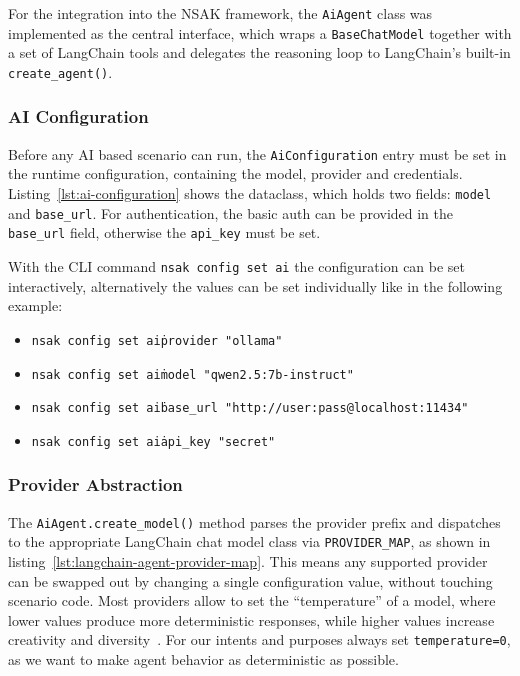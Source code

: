 For the integration into the \gls{NSAK} framework,
the \texttt{AiAgent} class was implemented as the central interface,
which wraps a \texttt{BaseChatModel} together with a set of LangChain tools and delegates the reasoning loop to LangChain's built-in \texttt{create_agent()}.

\subsubsection{AI Configuration}\label{subsubsec:ai-configuration}

Before any \gls{AI} based scenario can run, the \texttt{AiConfiguration} entry must be set in the runtime configuration,
containing the model, provider and credentials.
Listing~\ref{lst:ai-configuration} shows the dataclass, which holds two fields: \texttt{model} and \texttt{base_url}.
For authentication, the basic auth can be provided in the \texttt{base_url} field,
otherwise the \texttt{api_key} must be set.

With the \gls{CLI} command \texttt{nsak config set ai} the configuration can be set interactively,
alternatively the values can be set individually like in the following example:

\begin{itemize}
    \item \texttt{nsak config set ai\.provider "ollama"}
    \item \texttt{nsak config set ai\.model "qwen2.5:7b-instruct"}
    \item \texttt{nsak config set ai\.base\_url "http://user:pass@localhost:11434"}
    \item \texttt{nsak config set ai\.api\_key "secret"}
\end{itemize}

\subsubsection{Provider Abstraction}\label{subsubsec:ai-provider-abstraction}

The \texttt{AiAgent.create_model()} method parses the provider prefix and dispatches to the appropriate LangChain chat model class via \texttt{PROVIDER_MAP},
as shown in listing~\ref{lst:langchain-agent-provider-map}.
This means any supported provider can be swapped out by changing a single configuration value, without touching scenario code.
Most providers allow to set the \enquote{temperature} of a model,
where lower values produce more deterministic responses, while higher values increase creativity and diversity~\cite{anthropic_model_temperature}.
For our intents and purposes always set \texttt{temperature=0}, as we want to make agent behavior as deterministic as possible.


